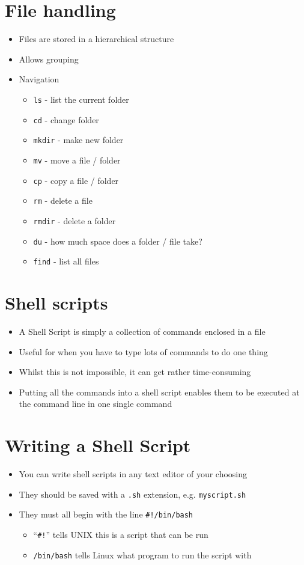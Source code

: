\documentclass{article}
\begin{document}
\section{File handling}
\begin{itemize}
\item Files are stored in a hierarchical structure
\item Allows grouping
\item Navigation
\begin{itemize}
\item \verb!ls! - list the current folder
\item \verb!cd! - change folder
\item \verb!mkdir! - make new folder
\item \verb!mv! - move a file / folder
\item \verb!cp! - copy a file / folder
\item \verb!rm! - delete a file
\item \verb!rmdir! - delete a folder
\item \verb!du! - how much space does a folder / file take?
\item \verb!find! - list all files
\end{itemize}
\end{itemize}

\section{Shell scripts}
\begin{itemize}
\item A Shell Script is simply a collection of commands enclosed in a file
\item Useful for when you have to type lots of commands to do one thing
\item Whilst this is not impossible, it can get rather time-consuming
\item Putting all the commands into a shell script enables them to be executed at the command line in one single command
\end{itemize}



\section{Writing a Shell Script}
\begin{itemize}
\item You can write shell scripts in any text editor of your choosing

\item They should be saved with a \verb!.sh! extension, e.g. \verb!myscript.sh!

\item They must all begin with the line \verb~#!/bin/bash~
\begin{itemize}
\item ``\verb~#!~'' tells UNIX this is a script that can be run
\item \verb!/bin/bash! tells Linux what program to run the script with
\end{itemize}
\end{itemize}
\end{document}
